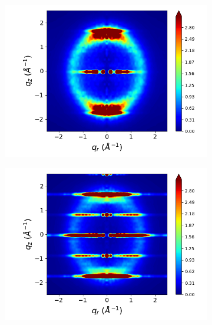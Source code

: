 \documentclass{article}
\begin{document}
\begin{figure}[htb]
\begin{subfigure}{0.3\linewidth}
  	\includegraphics[width=\textwidth]{rotated_carboxylate_rzplot_norestraints.png}
  	\caption{}\label{fig:rotated_carboxylate_rzplot_norestraints}
  \end{subfigure}
  \begin{subfigure}{0.3\linewidth}
  	\centering
  	\includegraphics[width=\textwidth]{staggered_rzplot_norestraints.png}
  	\caption{}\label{fig:staggered_rzplot_norestraints}
  \end{subfigure}
  \begin{subfigure}{0.3\linewidth}
  	\centering

\end{subfigure}
\end{figure}
\end{document}
